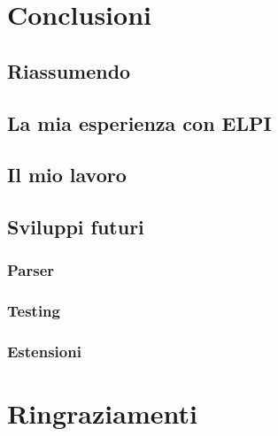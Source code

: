 \documentclass[12pt,a4paper,openright,twoside]{report}
\begin{document}
\clearpage{\pagestyle{empty}\cleardoublepage}		%


\chapter{Conclusioni}		%



\section{Riassumendo}

\section{La mia esperienza con ELPI}

\section{Il mio lavoro}

\section{Sviluppi futuri}
\subsection{Parser}
\subsection{Testing}
\subsection{Estensioni}







\clearpage{\pagestyle{empty}\cleardoublepage}	%


\chapter*{Ringraziamenti}

\thispagestyle{empty}

\end{document}
